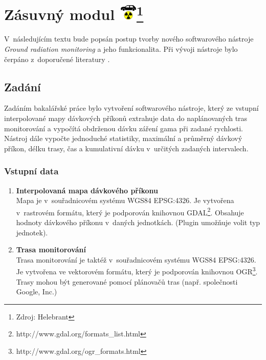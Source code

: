 \chapter[Zásuvný modul]{Zásuvný modul \includegraphics[scale=0.65]{./pictures/ikonka.png}\footnote{Zdroj: Helebrant}}
\label{4-plugin}

V~následujícím textu bude popsán postup tvorby nového softwarového nástroje \textit{Ground radiation monitoring} a jeho funkcionalita. Při vývoji nástroje bylo čerpáno z~doporučené literatury \cite{masteringQgis}\cite{diveIntoPython}\cite{rapidPyQt}. 

\section{Zadání}
Zadáním bakalářské práce bylo vytvoření softwarového nástroje, který ze vstupní interpolované mapy dávkových příkonů extrahuje data do naplánovaných tras monitorování a vypočítá obdrženou dávku záření gama při zadané rychlosti. Nástroj dále vypočte jednoduché statistiky, maximální a průměrný dávkový příkon, délku trasy, čas a kumulativní dávku v~určitých zadaných intervalech.

\subsection{Vstupní data}
\label{subsec:vstupniData}
\begin{enumerate}
	\item \textbf{Interpolovaná mapa dávkového příkonu} \\
	Mapa je v~souřadnicovém systému WGS84 EPSG:4326. Je vytvořena v~rastrovém formátu, který je podporován knihovnou GDAL\footnote{http://www.gdal.org/formats\_list.html}. Obsahuje hodnoty dávkového příkonu v~daných jednotkách. (Plugin umožňuje volit typ jednotek).  
	\item \textbf{Trasa monitorování} \\
	Trasa monitorování je taktéž v~souřadnicovém systému WGS84 EPSG:4326. Je vytvořena ve vektorovém formátu, který je podporován knihovnou OGR\footnote{http://www.gdal.org/ogr\_formats.html}. Trasy mohou být generované pomocí plánovačů tras (např. společnosti Google, Inc.) 
\end{enumerate}

